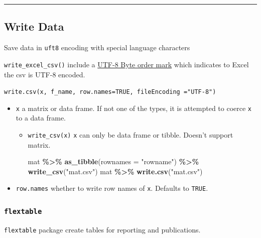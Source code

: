 \documentclass[
]{book}
\newenvironment{Shaded}{\begin{snugshade}}{\end{snugshade}}
\newcommand{\AttributeTok}[1]{\textcolor[rgb]{0.13,0.29,0.53}{#1}}
\newcommand{\FunctionTok}[1]{\textcolor[rgb]{0.13,0.29,0.53}{\textbf{#1}}}
\newcommand{\NormalTok}[1]{#1}
\newcommand{\SpecialCharTok}[1]{\textcolor[rgb]{0.81,0.36,0.00}{\textbf{#1}}}
\newcommand{\StringTok}[1]{\textcolor[rgb]{0.31,0.60,0.02}{#1}}
\theoremstyle{definition}
\theoremstyle{definition}
\theoremstyle{definition}
\theoremstyle{definition}
\theoremstyle{remark}
\begin{document}
\begin{center}\rule{0.5\linewidth}{0.5pt}\end{center}

\subsection{Write Data}\label{write-data}

Save data in \texttt{uft8} encoding with special language characters

\texttt{write\_excel\_csv()} include a \href{https://en.wikipedia.org/wiki/Byte_order_mark}{UTF-8 Byte order mark} which indicates to Excel the csv is UTF-8 encoded.

\texttt{write.csv(x,\ f\_name,\ row.names=TRUE,\ fileEncoding\ ="UTF-8")}

\begin{itemize}
\item
  \texttt{x} a matrix or data frame. If not one of the types, it is attempted to coerce \texttt{x} to a data frame.

  \begin{itemize}
  \item
    \texttt{write\_csv(x)} \texttt{x} can only be data frame or tibble. Doesn't support matrix.

\begin{Shaded}
\begin{Highlighting}[]
\NormalTok{mat }\SpecialCharTok{\%\textgreater{}\%} \FunctionTok{as\_tibble}\NormalTok{(}\AttributeTok{rownames =} \StringTok{"rowname"}\NormalTok{) }\SpecialCharTok{\%\textgreater{}\%} \FunctionTok{write\_csv}\NormalTok{(}\StringTok{"mat.csv"}\NormalTok{)}
\NormalTok{mat }\SpecialCharTok{\%\textgreater{}\%} \FunctionTok{write.csv}\NormalTok{(}\StringTok{"mat.csv"}\NormalTok{)}
\end{Highlighting}
\end{Shaded}
  \end{itemize}
\item
  \texttt{row.names} whether to write row names of \texttt{x}. Defaults to \texttt{TRUE}.
\end{itemize}

\subsubsection{\texorpdfstring{\texttt{flextable}}{flextable}}\label{flextable}

\texttt{flextable} package create tables for reporting and publications.
\end{document}
